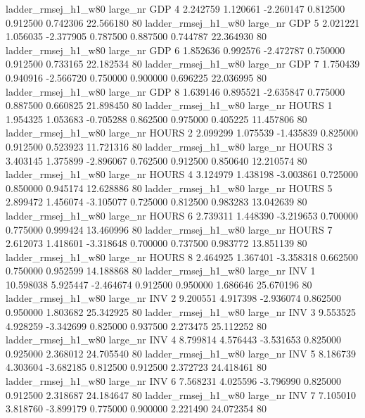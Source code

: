ladder_rmsej_h1_w80   large_nr      GDP                 4  2.242759  1.120661  -2.260147 0.812500 0.912500  0.742306   22.566180 80
ladder_rmsej_h1_w80   large_nr      GDP                 5  2.021221  1.056035  -2.377905 0.787500 0.887500  0.744787   22.364930 80
ladder_rmsej_h1_w80   large_nr      GDP                 6  1.852636  0.992576  -2.472787 0.750000 0.912500  0.733165   22.182534 80
ladder_rmsej_h1_w80   large_nr      GDP                 7  1.750439  0.940916  -2.566720 0.750000 0.900000  0.696225   22.036995 80
ladder_rmsej_h1_w80   large_nr      GDP                 8  1.639146  0.895521  -2.635847 0.775000 0.887500  0.660825   21.898450 80
ladder_rmsej_h1_w80   large_nr    HOURS                 1  1.954325  1.053683  -0.705288 0.862500 0.975000  0.405225   11.457806 80
ladder_rmsej_h1_w80   large_nr    HOURS                 2  2.099299  1.075539  -1.435839 0.825000 0.912500  0.523923   11.721316 80
ladder_rmsej_h1_w80   large_nr    HOURS                 3  3.403145  1.375899  -2.896067 0.762500 0.912500  0.850640   12.210574 80
ladder_rmsej_h1_w80   large_nr    HOURS                 4  3.124979  1.438198  -3.003861 0.725000 0.850000  0.945174   12.628886 80
ladder_rmsej_h1_w80   large_nr    HOURS                 5  2.899472  1.456074  -3.105077 0.725000 0.812500  0.983283   13.042639 80
ladder_rmsej_h1_w80   large_nr    HOURS                 6  2.739311  1.448390  -3.219653 0.700000 0.775000  0.999424   13.460996 80
ladder_rmsej_h1_w80   large_nr    HOURS                 7  2.612073  1.418601  -3.318648 0.700000 0.737500  0.983772   13.851139 80
ladder_rmsej_h1_w80   large_nr    HOURS                 8  2.464925  1.367401  -3.358318 0.662500 0.750000  0.952599   14.188868 80
ladder_rmsej_h1_w80   large_nr      INV                 1 10.598038  5.925447  -2.464674 0.912500 0.950000  1.686646   25.670196 80
ladder_rmsej_h1_w80   large_nr      INV                 2  9.200551  4.917398  -2.936074 0.862500 0.950000  1.803682   25.342925 80
ladder_rmsej_h1_w80   large_nr      INV                 3  9.553525  4.928259  -3.342699 0.825000 0.937500  2.273475   25.112252 80
ladder_rmsej_h1_w80   large_nr      INV                 4  8.799814  4.576443  -3.531653 0.825000 0.925000  2.368012   24.705540 80
ladder_rmsej_h1_w80   large_nr      INV                 5  8.186739  4.303604  -3.682185 0.812500 0.912500  2.372723   24.418461 80
ladder_rmsej_h1_w80   large_nr      INV                 6  7.568231  4.025596  -3.796990 0.825000 0.912500  2.318687   24.184647 80
ladder_rmsej_h1_w80   large_nr      INV                 7  7.105010  3.818760  -3.899179 0.775000 0.900000  2.221490   24.072354 80
